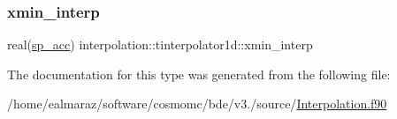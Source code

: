 \subsubsection{\texorpdfstring{xmin\+\_\+interp}{xmin\_interp}}
{\footnotesize\ttfamily real(\mbox{\hyperlink{namespaceinterpolation_af72aa9a05feb8ef90b2d26e4a013abf3}{sp\+\_\+acc}}) interpolation\+::tinterpolator1d\+::xmin\+\_\+interp}



The documentation for this type was generated from the following file\+:\begin{DoxyCompactItemize}
\item 
/home/ealmaraz/software/cosmomc/bde/v3./source/\mbox{\hyperlink{Interpolation_8f90}{Interpolation.\+f90}}\end{DoxyCompactItemize}
